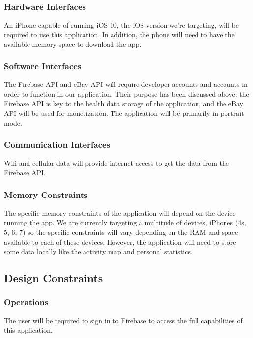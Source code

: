 \documentclass[letterpaper,10pt,titlepage]{article}
\begin{document}
\subsubsection{Hardware Interfaces}

An iPhone capable of running iOS 10, the iOS version we’re targeting, will be required to use this application. In addition, the phone will need to have the available memory space to download the app.

\subsubsection{Software Interfaces}

The Firebase API and eBay API will require developer accounts and accounts in order to function in our application. Their purpose has been discussed above: the Firebase API is key to the health data storage of the application, and the eBay API will be used for monetization. The application will be primarily in portrait mode.

\subsubsection{Communication Interfaces}

Wifi and cellular data will provide internet access to get the data from the Firebase API.

\subsubsection{Memory Constraints}

The specific memory constraints of the application will depend on the device running the app. We are currently targeting a multitude of devices, iPhones (4s, 5, 6, 7) so the specific constraints will vary depending on the RAM and space available to each of these devices. However, the application will need to store some data locally like the activity map and personal statistics.

\subsection{Design Constraints}

\subsubsection{Operations}

The user will be required to sign in to Firebase to access the full capabilities of this application.
\end{document}
